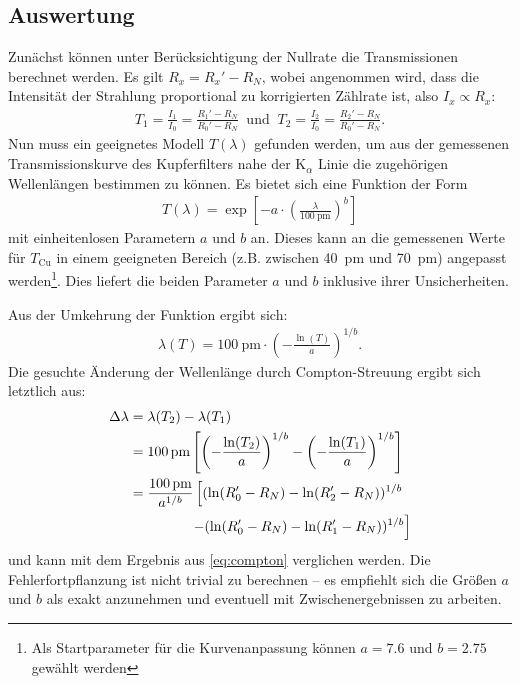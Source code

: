 \documentclass[ngerman,a4paper,twocolumn,twoside]{scrartcl}
\begin{document}
\subsection*{Auswertung}
Zunächst können unter Berücksichtigung der Nullrate die Transmissionen berechnet werden. Es gilt $R_x=R_x'-R_N$, wobei angenommen wird, dass die Intensität der Strahlung proportional zu korrigierten Zählrate ist, also $I_x \propto R_x$:
\begin{align}
T_1= \frac{I_1}{I_0} = \frac{R_1'-R_N}{R_0'-R_N} \;\;\text{und}\;\; T_2= \frac{I_2}{I_0} = \frac{R_2'-R_N}{R_0'-R_N}.
\end{align}
Nun muss ein geeignetes Modell $T(\lambda)$ gefunden werden, um aus der gemessenen Transmissionskurve des Kupferfilters nahe der $\mathrm{K}_\alpha$ Linie die zugehörigen Wellenlängen bestimmen zu können. Es bietet sich eine Funktion der Form
\begin{align}
T(\lambda) = \exp\left[-a\cdot\left(\frac{\lambda}{\SI{100}{\pico\meter}}\right)^b\right]
\end{align}
mit einheitenlosen Parametern $a$ und $b$ an. Dieses kann an die gemessenen Werte für $T_\text{Cu}$  in einem geeigneten Bereich (z.B. zwischen \SI{40}{\pico\meter} und \SI{70}{\pico\meter}) angepasst werden\footnote{Als Startparameter für die Kurvenanpassung können $a=\num{7.6}$ und $b=\num{2.75}$ gewählt werden}. Dies liefert die beiden Parameter $a$ und $b$ inklusive ihrer Unsicherheiten.
\par
Aus der Umkehrung der Funktion ergibt sich:
\begin{align}
\lambda(T)=\SI{100}{\pico\meter}\cdot\left(-\frac{\ln(T)}{a}\right)^{1/b}.
\end{align}
Die gesuchte Änderung der Wellenlänge durch Compton-Streuung ergibt sich letztlich aus:
\begin{align}
\Delta \lambda&= \lambda(T_2) - \lambda(T_1) \\
&=\SI{100}{\pico\meter}\left[\left(-\frac{\ln(T_2)}{a}\right)^{1/b}-\left(-\frac{\ln(T_1)}{a}\right)^{1/b}\right]  \label{eq:allgemeindeltalabda}\\
&=\frac{\SI{100}{\pico\meter}}{a^{1/b}}\left[(\ln(R_0'-R_N)-\ln(R_2'-R_N))^{1/b}\right.\notag\\&\phantom{=\frac{\SI{100}{\pico\meter}}{a^{1/b}}}\left.-(\ln(R_0'-R_N)-\ln(R_1'-R_N))^{1/b}\right]
\end{align}
und kann mit dem Ergebnis aus \cref{eq:compton} verglichen werden. Die Fehlerfortpflanzung ist nicht trivial zu berechnen -- es empfiehlt sich die Größen $a$ und $b$ als exakt anzunehmen und eventuell mit Zwischenergebnissen zu arbeiten.
\end{document}
